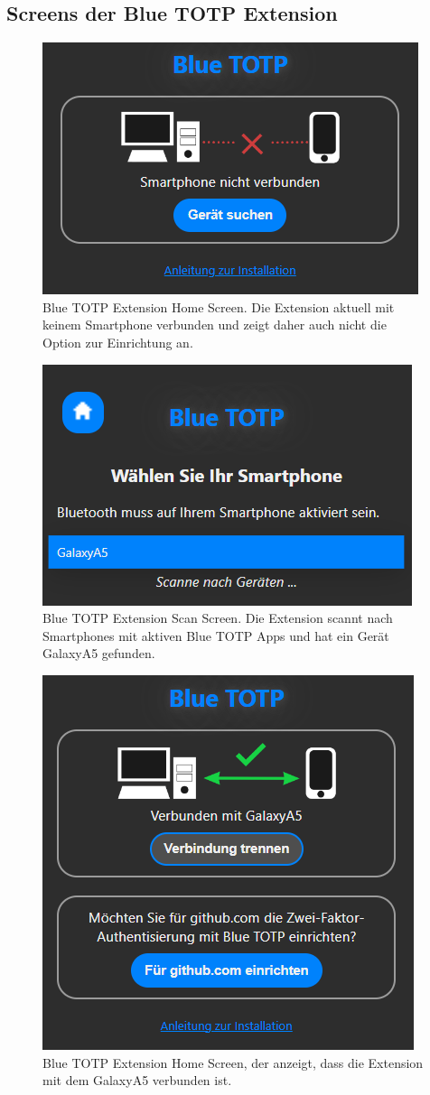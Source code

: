 \subsection{Screens der Blue TOTP Extension}
\label{anh: blue totp ext screens}

\begin{figure}[H]
    \centering
    \includegraphics[width=0.5\linewidth]{figures/impl/ext_nicht_verbunden.png}
    \caption[Blue TOTP Extension Home Screen]{Blue TOTP Extension Home Screen. Die Extension aktuell mit keinem Smartphone verbunden und zeigt daher auch nicht die Option zur Einrichtung an.}
    \label{fig: blue totp ext screenshot nicht verbunden}
\end{figure}

\begin{figure}[H]
    \centering
    \includegraphics[width=0.5\linewidth]{figures/impl/ext_scan.png}
    \caption[Blue TOTP Extension Scan Screen]{Blue TOTP Extension Scan Screen. Die Extension scannt nach Smartphones mit aktiven Blue TOTP Apps und hat ein Gerät \glqq GalaxyA5\grqq{} gefunden.}
    \label{fig: blue totp ext screenshot scan}
\end{figure}

\begin{figure}[H]
    \centering
    \includegraphics[width=0.5\linewidth]{figures/impl/ext_verbunden.png}
    \caption[Blue TOTP Extension Home Screen (verbunden)]{Blue TOTP Extension Home Screen, der anzeigt, dass die Extension mit dem \glqq GalaxyA5\grqq{} verbunden ist.}
    \label{fig: blue totp ext screenshot verbunden}
\end{figure}

